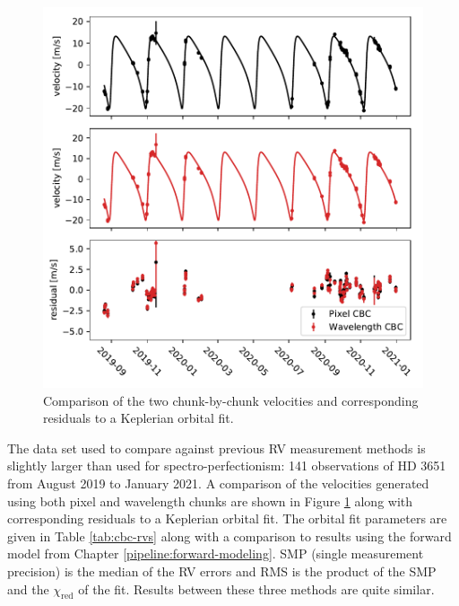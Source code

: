 \begin{figure}
    \centering
    \includegraphics[width=\textwidth]{figures-5/cbc-comparison.pdf}
    \caption[Keplerian orbital fit comparison between chunk methods]{Comparison of the two chunk-by-chunk velocities and corresponding residuals to a Keplerian orbital fit.}
    \label{fig:cbc-comparison}
\end{figure}

The data set used to compare against previous RV measurement methods is slightly larger than used for spectro-perfectionism: 141 observations of HD 3651 from August 2019 to January 2021. A comparison of the velocities generated using both pixel and wavelength chunks are shown in Figure \ref{fig:cbc-comparison} along with corresponding residuals to a Keplerian orbital fit. The orbital fit parameters are given in Table \ref{tab:cbc-rvs} along with a comparison to results using the forward model from Chapter \ref{pipeline:forward-modeling}. SMP (single measurement precision) is the median of the RV errors and RMS is the product of the SMP and the $\chi_\mathrm{red}$ of the fit. Results between these three methods are quite similar.

